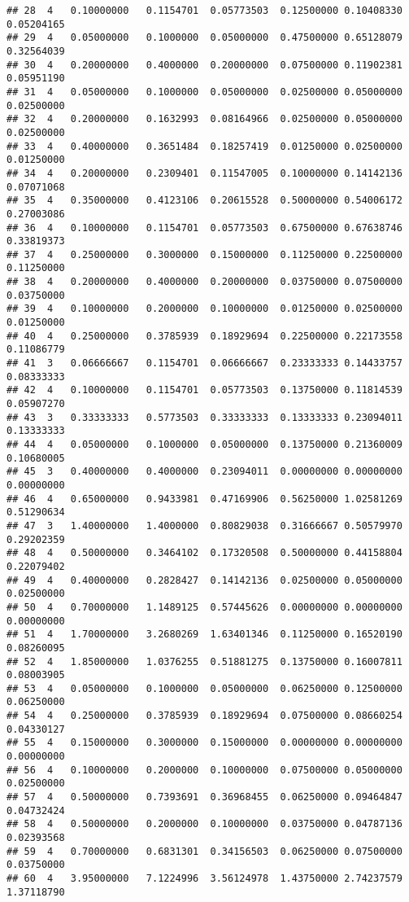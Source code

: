 \documentclass[
]{article}
\begin{document}
\begin{verbatim}
## 28  4   0.10000000   0.1154701  0.05773503  0.12500000 0.10408330 0.05204165
## 29  4   0.05000000   0.1000000  0.05000000  0.47500000 0.65128079 0.32564039
## 30  4   0.20000000   0.4000000  0.20000000  0.07500000 0.11902381 0.05951190
## 31  4   0.05000000   0.1000000  0.05000000  0.02500000 0.05000000 0.02500000
## 32  4   0.20000000   0.1632993  0.08164966  0.02500000 0.05000000 0.02500000
## 33  4   0.40000000   0.3651484  0.18257419  0.01250000 0.02500000 0.01250000
## 34  4   0.20000000   0.2309401  0.11547005  0.10000000 0.14142136 0.07071068
## 35  4   0.35000000   0.4123106  0.20615528  0.50000000 0.54006172 0.27003086
## 36  4   0.10000000   0.1154701  0.05773503  0.67500000 0.67638746 0.33819373
## 37  4   0.25000000   0.3000000  0.15000000  0.11250000 0.22500000 0.11250000
## 38  4   0.20000000   0.4000000  0.20000000  0.03750000 0.07500000 0.03750000
## 39  4   0.10000000   0.2000000  0.10000000  0.01250000 0.02500000 0.01250000
## 40  4   0.25000000   0.3785939  0.18929694  0.22500000 0.22173558 0.11086779
## 41  3   0.06666667   0.1154701  0.06666667  0.23333333 0.14433757 0.08333333
## 42  4   0.10000000   0.1154701  0.05773503  0.13750000 0.11814539 0.05907270
## 43  3   0.33333333   0.5773503  0.33333333  0.13333333 0.23094011 0.13333333
## 44  4   0.05000000   0.1000000  0.05000000  0.13750000 0.21360009 0.10680005
## 45  3   0.40000000   0.4000000  0.23094011  0.00000000 0.00000000 0.00000000
## 46  4   0.65000000   0.9433981  0.47169906  0.56250000 1.02581269 0.51290634
## 47  3   1.40000000   1.4000000  0.80829038  0.31666667 0.50579970 0.29202359
## 48  4   0.50000000   0.3464102  0.17320508  0.50000000 0.44158804 0.22079402
## 49  4   0.40000000   0.2828427  0.14142136  0.02500000 0.05000000 0.02500000
## 50  4   0.70000000   1.1489125  0.57445626  0.00000000 0.00000000 0.00000000
## 51  4   1.70000000   3.2680269  1.63401346  0.11250000 0.16520190 0.08260095
## 52  4   1.85000000   1.0376255  0.51881275  0.13750000 0.16007811 0.08003905
## 53  4   0.05000000   0.1000000  0.05000000  0.06250000 0.12500000 0.06250000
## 54  4   0.25000000   0.3785939  0.18929694  0.07500000 0.08660254 0.04330127
## 55  4   0.15000000   0.3000000  0.15000000  0.00000000 0.00000000 0.00000000
## 56  4   0.10000000   0.2000000  0.10000000  0.07500000 0.05000000 0.02500000
## 57  4   0.50000000   0.7393691  0.36968455  0.06250000 0.09464847 0.04732424
## 58  4   0.50000000   0.2000000  0.10000000  0.03750000 0.04787136 0.02393568
## 59  4   0.70000000   0.6831301  0.34156503  0.06250000 0.07500000 0.03750000
## 60  4   3.95000000   7.1224996  3.56124978  1.43750000 2.74237579 1.37118790

\end{verbatim}
\end{document}
